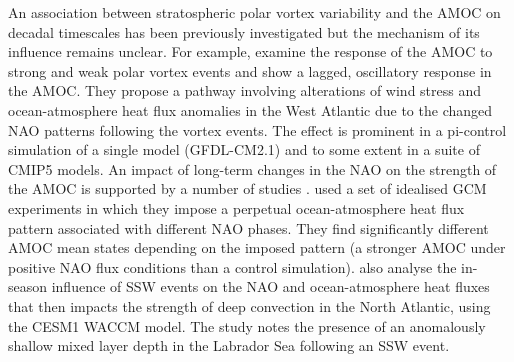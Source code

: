 An association between stratospheric polar vortex variability and the AMOC on decadal timescales has been previously investigated \citep{schimankeMultidecadal2011b, reichlerStratospheric2012b} but the mechanism of its influence remains unclear. For example, \cite{reichlerStratospheric2012b} examine the response of the AMOC to strong and weak polar vortex events and show a lagged, oscillatory response in the AMOC. They propose a pathway involving alterations of wind stress and ocean-atmosphere heat flux anomalies in the West Atlantic due to the changed NAO patterns following the vortex events. The effect is prominent in a pi-control simulation of a single model (GFDL-CM2.1) and to some extent in a suite of CMIP5 models. An impact of long-term changes in the NAO on the strength of the AMOC is supported by a number of studies \citep{visbeckOcean1998b, delworthImplications2000b, delworthMultidecadal2000b, edenMechanism2001b, lohmannResponse2009, robsonCauses2012c}. \cite{delworthImpact2016c} used a set of idealised GCM experiments in which they impose a perpetual ocean-atmosphere heat flux pattern associated with different NAO phases. They find significantly different AMOC mean states depending on the imposed pattern (a stronger AMOC under positive NAO flux conditions than a control simulation). \cite{haaseImportance2018b} also analyse the in-season influence of SSW events on the NAO and ocean-atmosphere heat fluxes that then impacts the strength of deep convection in the North Atlantic, using the CESM1 WACCM model. The study notes the presence of an anomalously shallow  mixed layer depth in the Labrador Sea following an SSW event. 

